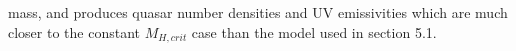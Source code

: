 \documentclass[12pt, twocolumn]{report}%
\begin{document}
\twocolumngrid


\noindent mass, and produces quasar number densities and UV emissivities which are much closer to the constant $M_{H,crit}$ case than the model used in section 5.1.









\end{document}
